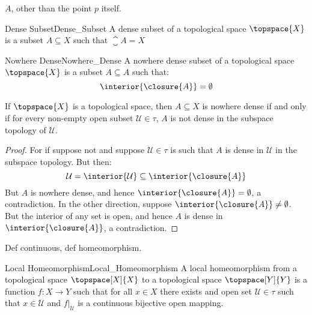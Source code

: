 \documentclass{article}                                                        %
\begin{document}
        $A$, other than the point $p$ itself.
        \begin{fdefinition}{Dense Subset}{Dense_Subset}
            A dense subset of a topological space $\topspace{X}$ is a subset
            $A\subseteq{X}$ such that $\closure{A}=X$
        \end{fdefinition}
        \begin{fdefinition}{Nowhere Dense}{Nowhere_Dense}
            A nowhere dense subset of a topological space $\topspace{X}$ is a
            subset $A\subseteq{A}$ such that:
            \begin{equation*}
                \interior{\closure{A}}=\emptyset
            \end{equation*}
        \end{fdefinition}
        \begin{theorem}
            If $\topspace{X}$ is a topological space, then $A\subseteq{X}$ is
            nowhere dense if and only if for every non-empty open subset
            $\mathcal{U}\in\tau$, $A$ is not dense in the subspace topology of
            $\mathcal{U}$.
        \end{theorem}
        \begin{proof}
            For if suppose not and suppose $\mathcal{U}\in\tau$ is such that
            $A$ is dense in $\mathcal{U}$ in the subspace topology. But then:
            \begin{equation}
                \mathcal{U}=\interior{\mathcal{U}}
                    \subseteq\interior{\closure{A}}
            \end{equation}
            But $A$ is nowhere dense, and hence
            $\interior{\closure{A}}=\emptyset$, a contradiction. In the other
            direction, suppose $\interior{\closure{A}}\ne\emptyset$. But the
            interior of any set is open, and hence $A$ is dense in
            $\interior{\closure{A}}$, a contradiction.
        \end{proof}
        Def continuous, def homeomorphism.
        \begin{fdefinition}{Local Homeomorphism}{Local_Homeomorphism}
            A local homeomorphism from a topological space $\topspace[X]{X}$ to
            a topological space $\topspace[Y]{Y}$ is a function
            $f:X\rightarrow{Y}$ such that for all $x\in{X}$ there exists and
            open set $\mathcal{U}\in\tau$ such that $x\in\mathcal{U}$ and
            $f|_{\mathcal{U}}$ is a continuous bijective open mapping.
        \end{fdefinition}
\end{document}
